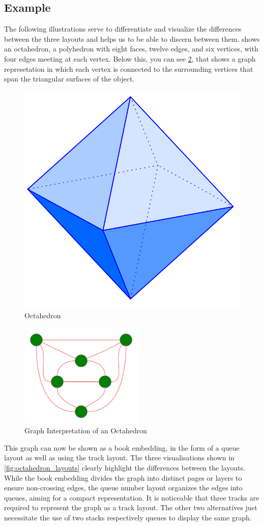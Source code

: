 \documentclass[bachelor, english]{algothesis}
\begin{document}
\subsection{Example}
The following illustrations serve to differentiate and visualize the differences between the three layouts and helps us to be able to discern between them.  shows an octahedron, a polyhedron with eight faces, twelve edges, and six vertices, with four edges meeting at each vertex. Below this, you can see \cref{fig:octahedron_graph}, that shows a graph represetation in which each vertex is connected to the surrounding vertices that span the triangular surfaces of the object.

\begin{figure}[ht]
    \centering
    \includegraphics[width=0.5\linewidth]{figures/octahedron.png}
    \caption{Octahedron \protect\footnotemark}
    \label{fig:octahedron}
\end{figure}

\begin{figure}[ht]
    \centering
    \includegraphics[width=0.525\textwidth]{figures/octahedron_graph.png}
    \caption{Graph Interpretation of an Octahedron}
    \label{fig:octahedron_graph}
\end{figure}
\noindent
This graph can now be shown as a book embedding, in the form of a queue layout as well as using the track layout. The three visualisations shown in \cref{fig:octahedron_layouts} clearly highlight the differences between the layouts. While the book embedding divides the graph into distinct pages or layers to ensure non-crossing edges, the queue number layout organizes the edges into queues, aiming for a compact representation. It is noticeable that three tracks are required to represent the graph as a track layout. The other two alternatives just necessitate the use of two stacks respectively queues to display the same graph.
\end{document}
